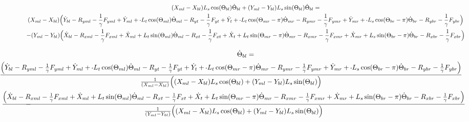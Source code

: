 \documentclass[11pt, landscape]{article}
\newcommand{\mn}{\scalebox{0.7}[1.0]{-}}
\begin{document}
\begin{multline}
(X_{ml} - X_{bl}) L_{s}\cos(\Theta_{bl}) \dot{\Theta}_{bl} + (Y_{ml} - Y_{bl})L_{s}\sin(\Theta_{bl}) \dot{\Theta}_{bl} = \\
(X_{ml} - X_{bl})\Big( \dot{Y}_{bl} - R_{yml} - \frac{1}{\gamma}F_{yml} + \dot{Y}_{ml} + \mn L_{t}\cos(\Theta_{ml}) \dot{\Theta}_{ml}
- R_{yt} - \frac{1}{\gamma}F_{yt } + \dot{Y}_{t } + \mn L_{t}\cos(\Theta_{mr}-\pi)  \dot{\Theta}_{mr} - R_{ymr} - \frac{1}{\gamma}F_{ymr} + \dot{Y}_{mr}
+ \mn L_{s}\cos(\Theta_{br}-\pi)  \dot{\Theta}_{br} - R_{ybr} - \frac{1}{\gamma}F_{ybr} \Big) \\
- (Y_{ml} - Y_{bl})\Big( \dot{X}_{bl} - R_{xml} - \frac{1}{\gamma}F_{xml} + \dot{X}_{ml} + L_{t}\sin(\Theta_{ml}) \dot{\Theta}_{ml} - R_{xt } - \frac{1}{\gamma}F_{xt }
+ \dot{X}_{t } + L_{t}\sin(\Theta_{mr}-\pi)  \dot{\Theta}_{mr} - R_{xmr}  -\frac{1}{\gamma}F_{xmr} + \dot{X}_{mr} + L_{s}\sin(\Theta_{br}-\pi)  \dot{\Theta}_{br} - R_{xbr} - \frac{1}{\gamma}F_{xbr} \Big)
\end{multline}

\begin{multline}
\dot{\Theta}_{bl} = \\
\hspace*{-1.5cm}\frac{\Big( \dot{Y}_{bl} - R_{yml} - \frac{1}{\gamma}F_{yml} + \dot{Y}_{ml} + \mn L_{t}\cos(\Theta_{ml}) \dot{\Theta}_{ml}
- R_{yt} - \frac{1}{\gamma}F_{yt } + \dot{Y}_{t } + \mn L_{t}\cos(\Theta_{mr}-\pi)  \dot{\Theta}_{mr} - R_{ymr} - \frac{1}{\gamma}F_{ymr} + \dot{Y}_{mr}
+ \mn L_{s}\cos(\Theta_{br}-\pi)  \dot{\Theta}_{br} - R_{ybr} - \frac{1}{\gamma}F_{ybr} \Big)}
{\frac{1}{(X_{ml} - X_{bl})}\Big( (X_{ml} - X_{bl}) L_{s}\cos(\Theta_{bl}) + (Y_{ml} - Y_{bl})L_{s}\sin(\Theta_{bl}) \Big)} \\
- \hspace*{-1.5cm}\frac{\Big( \dot{X}_{bl} - R_{xml} - \frac{1}{\gamma}F_{xml} + \dot{X}_{ml} + L_{t}\sin(\Theta_{ml}) \dot{\Theta}_{ml} - R_{xt } - \frac{1}{\gamma}F_{xt }
+ \dot{X}_{t } + L_{t}\sin(\Theta_{mr}-\pi)  \dot{\Theta}_{mr} - R_{xmr}  -\frac{1}{\gamma}F_{xmr} + \dot{X}_{mr} + L_{s}\sin(\Theta_{br}-\pi)  \dot{\Theta}_{br} - R_{xbr} - \frac{1}{\gamma}F_{xbr} \Big)}
{\frac{1}{(Y_{ml} - Y_{bl})}\Big( (X_{ml} - X_{bl}) L_{s}\cos(\Theta_{bl}) + (Y_{ml} - Y_{bl})L_{s}\sin(\Theta_{bl}) \Big)}
\end{multline}
\end{document}
